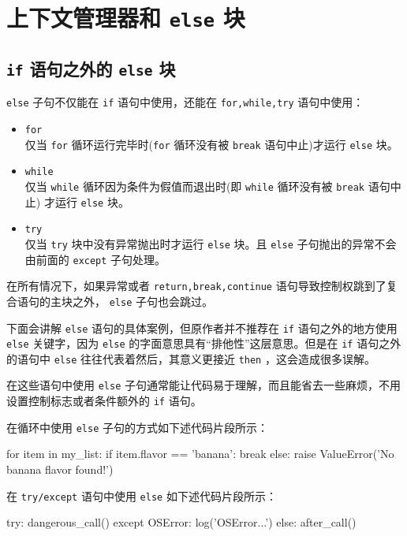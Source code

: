 \section{上下文管理器和 \texttt{else} 块}
\subsection{\texttt{if} 语句之外的 \texttt{else} 块}

\texttt{else} 子句不仅能在 \texttt{if} 语句中使用，还能在 \texttt{for,while,try} 语句中使用：

\begin{itemize}
    \item \texttt{for} \\
    仅当 \texttt{for} 循环运行完毕时(\texttt{for} 循环没有被 \texttt{break} 语句中止)才运行 \texttt{else} 块。
    \item \texttt{while} \\
    仅当 \texttt{while} 循环因为条件为假值而退出时(即 \texttt{while} 循环没有被 \texttt{break} 语句中止) 才运行 \texttt{else} 块。
    \item \texttt{try} \\
    仅当 \texttt{try} 块中没有异常抛出时才运行 \texttt{else} 块。且 \texttt{else} 子句抛出的异常不会由前面的 \texttt{except} 子句处理。
\end{itemize}

在所有情况下，如果异常或者 \texttt{return,break,continue} 语句导致控制权跳到了复合语句的主块之外， \texttt{else} 子句也会跳过。

下面会讲解 \texttt{else} 语句的具体案例，但原作者并不推荐在 \texttt{if} 语句之外的地方使用 \texttt{else} 关键字，因为 \texttt{else} 的字面意思具有``排他性''这层意思。但是在 \texttt{if} 语句之外的语句中 \texttt{else} 往往代表着然后，其意义更接近 \texttt{then} ，这会造成很多误解。

在这些语句中使用 \texttt{else} 子句通常能让代码易于理解，而且能省去一些麻烦，不用设置控制标志或者条件额外的 \texttt{if} 语句。

在循环中使用 \texttt{else} 子句的方式如下述代码片段所示：

\begin{python}
for item in my_list:
    if item.flavor == 'banana':
        break
else:
    raise ValueError('No banana flavor found!')
\end{python}

在 \texttt{try/except} 语句中使用 \texttt{else} 如下述代码片段所示：
\begin{python}
try:
    dangerous_call()
except OSError:
    log('OSError...')
else:
    after_call()
\end{python}
 
